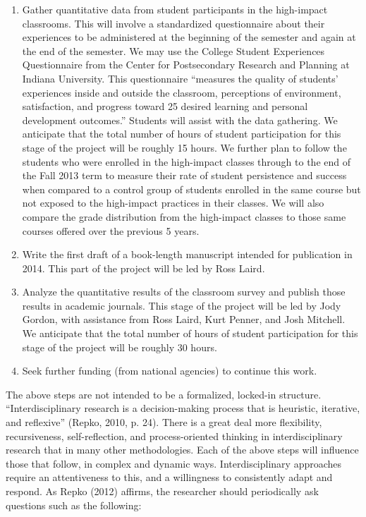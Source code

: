 \documentclass[letterpaper,10pt,headsepline]{scrreprt}
\begin{document}
\begin{enumerate}
\item Gather quantitative data from student participants in the high-impact
  classrooms. This will involve a standardized questionnaire about their
  experiences to be administered at the beginning of the semester and again at
  the end of the semester. We may use the College Student Experiences
  Questionnaire from the Center for Postsecondary Research and Planning at
  Indiana University. This questionnaire ``measures the quality of students'
  experiences inside and outside the classroom, perceptions of environment,
  satisfaction, and progress toward 25 desired learning and personal
  development outcomes.'' Students will assist with the data gathering. We
  anticipate that the total number of hours of student participation for this
  stage of the project will be roughly 15 hours. We further plan to follow the
  students who were enrolled in the high-impact classes through to the end
  of the Fall 2013 term to measure their rate of student persistence and
  success when compared to a control group of students enrolled in the same
  course but not exposed to the high-impact practices in their classes. We
  will also compare the grade distribution from the high-impact classes to
  those same courses offered over the previous 5 years.

\item Write the first draft of a book-length manuscript intended for
  publication in 2014. This part of the project will be led by Ross Laird.

\item Analyze the quantitative results of the classroom survey and publish
  those results in academic journals. This stage of the project will be led by
  Jody Gordon, with assistance from Ross Laird, Kurt Penner, and Josh
  Mitchell. We anticipate that the total number of hours of student
  participation for this stage of the project will be roughly 30 hours.

\item Seek further funding (from national agencies) to continue this work.

  \end{enumerate}

  The above steps are not intended to be a formalized, locked-in structure.
  ``Interdisciplinary research is a decision-making process that is heuristic,
  iterative, and reﬂexive'' (Repko, 2010, p. 24). There is a great deal more
  flexibility, recursiveness, self-reflection, and process-oriented thinking
  in interdisciplinary research that in many other methodologies. Each of the
  above steps will influence those that follow, in complex and dynamic ways.
  Interdisciplinary approaches require an attentiveness to this, and a
  willingness to consistently adapt and respond. As Repko (2012) affirms, the
  researcher should periodically ask questions such as the following:
\end{document}
